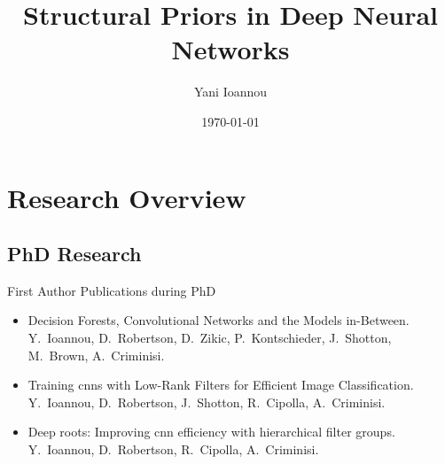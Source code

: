 \documentclass[t,xcolor=dvipsnames]{beamer}
\title[Structural Priors in Deep Neural Networks] %
{Structural Priors in Deep Neural Networks}
\author[Yani Ioannou]
{Yani Ioannou}
\institute[University of Cambridge] %
{University of Cambridge}
\date{\today}
\begin{document}


\begin{frame}
  \titlepage
\end{frame}






\section{Research Overview}

\subsection{PhD Research}

\begin{frame}{First Author Publications during PhD}
\begin{itemize}
    \item Decision Forests, Convolutional Networks and the Models in-Between.\\{\footnotesize Y.\ Ioannou, D.\ Robertson, D.\ Zikic, P.\ Kontschieder, J.\ Shotton, M.\ Brown, A.\ Criminisi.}%
    \item Training \glspl{cnn} with Low-Rank Filters for Efficient Image Classification.\\{\footnotesize Y.\ Ioannou, D.\ Robertson, J.\ Shotton, R.\ Cipolla, A.\ Criminisi.}%
    \item Deep roots: Improving \gls{cnn} efficiency with hierarchical filter groups.\\{\footnotesize Y.\ Ioannou, D.\ Robertson, R.\ Cipolla, A.\ Criminisi.}%
    
\end{itemize}
\end{frame}
\end{document}
